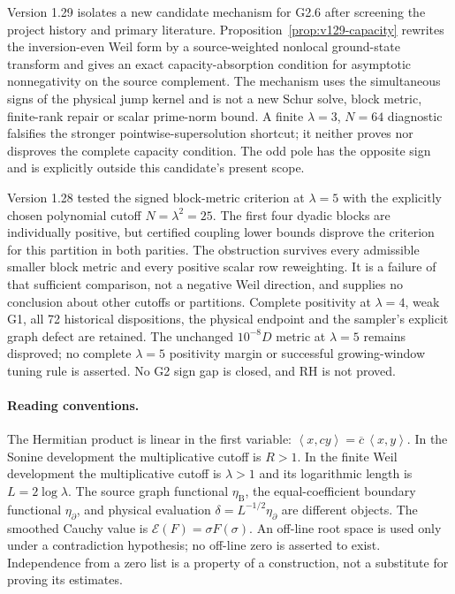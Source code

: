 \documentclass[11pt]{article}
\theoremstyle{remark}
\newcommand{\ip}[2]{\left\langle #1,#2\right\rangle}
\begin{document}
Version 1.29 isolates a new candidate mechanism for G2.6 after screening
the project history and primary literature. Proposition~\ref{prop:v129-capacity}
rewrites the inversion-even Weil form by a source-weighted nonlocal
ground-state transform and gives an exact capacity-absorption condition
for asymptotic nonnegativity on the source complement.  The mechanism
uses the simultaneous signs of the physical jump kernel and is not a
new Schur solve, block metric, finite-rank repair or scalar prime-norm
bound.  A finite $\lambda=3$, $N=64$ diagnostic falsifies the stronger
pointwise-supersolution shortcut; it neither proves nor disproves the
complete capacity condition.  The odd pole has the opposite sign and
is explicitly outside this candidate's present scope.

Version 1.28 tested the signed block-metric criterion at $\lambda=5$
with the explicitly chosen polynomial cutoff $N=\lambda^2=25$.
The first four dyadic blocks are individually positive, but certified
coupling lower bounds disprove the criterion for this partition in
both parities. The obstruction survives every admissible smaller
block metric and every positive scalar row reweighting. It is a
failure of that sufficient comparison, not a negative Weil direction,
and supplies no conclusion about other cutoffs or partitions.
Complete positivity at $\lambda=4$, weak G1, all 72 historical
dispositions, the physical endpoint and the sampler's explicit graph
defect are retained. The unchanged $10^{-8}D$ metric at $\lambda=5$
remains disproved; no complete $\lambda=5$ positivity margin or
successful growing-window tuning rule is asserted. No G2 sign gap
is closed, and RH is not proved.

\paragraph{Reading conventions.}
The Hermitian product is linear in the first variable:
$\ip{x}{cy}=\overline c\,\ip{x}{y}$.
In the Sonine development the multiplicative cutoff is $R>1$.
In the finite Weil development the multiplicative cutoff is $\lambda>1$
and its logarithmic length is $L=2\log\lambda$.
The source graph functional $\eta_{\mathrm B}$, the equal-coefficient
boundary functional $\eta_\partial$, and physical evaluation
$\delta=L^{-1/2}\eta_\partial$ are different objects.
The smoothed Cauchy value is $\mathscr E(F)=\sigma F(\sigma)$.
An off-line root space is used only under a contradiction hypothesis;
no off-line zero is asserted to exist. Independence from a zero list is
a property of a construction, not a substitute for proving its estimates.
\end{document}
